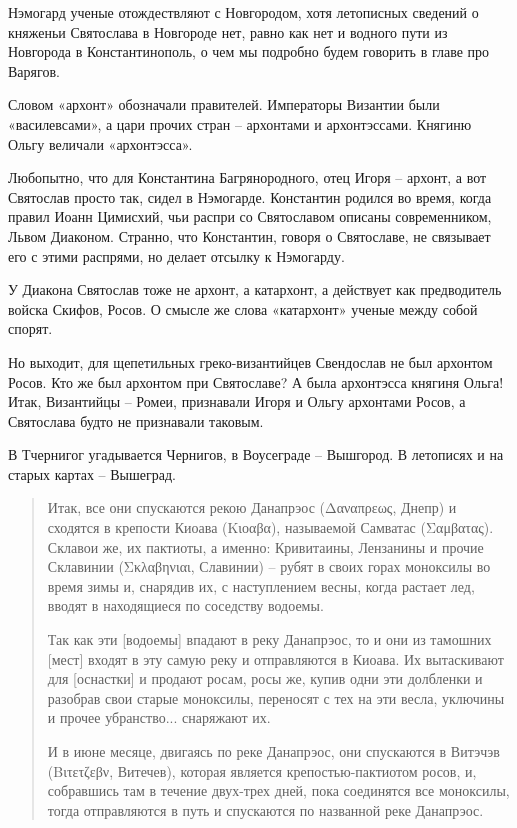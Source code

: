 Нэмогард ученые отождествляют с Новгородом, хотя летописных сведений о княженьи Святослава в Новгороде нет, равно как нет и водного пути из Новгорода в Константинополь, о чем мы подробно будем говорить в главе про Варягов.

Словом «архонт» обозначали правителей. Императоры Византии были «василевсами», а цари прочих стран – архонтами и архонтэссами. Княгиню Ольгу величали «архонтэсса». 

Любопытно, что для Константина Багрянородного, отец Игоря – архонт, а вот Святослав просто так, сидел в Нэмогарде. Константин родился во время, когда правил Иоанн Цимисхий, чьи распри со Святославом описаны современником, Львом Диаконом. Странно, что Константин, говоря о Святославе, не связывает его с этими распрями, но делает отсылку к Нэмогарду.

У Диакона Святослав тоже не архонт, а катархонт, а действует как предводитель войска Скифов, Росов. О смысле же слова «катархонт» ученые между собой спорят.

Но выходит, для щепетильных греко-византийцев Свендослав не был архонтом Росов. Кто же был архонтом при Святославе? А была архонтэсса княгиня Ольга! Итак, Византийцы – Ромеи, признавали Игоря и Ольгу архонтами Росов, а Святослава будто не признавали таковым.

В Тчернигог угадывается Чернигов, в Воусеграде – Вышгород. В летописях и на старых картах – Вышеград.

\begin{quotation}
Итак, все они спускаются рекою Данапрэос (Δανα\-πρεως, Днепр) и сходятся в крепости Киоава (Κιοαβα), называемой Самватас (Σαμβατας). Склавои же, их пактиоты, а именно: Кривитаины, Лензанины и прочие Склавинии (Σκλαβηνι\-αι, Славинии) – рубят в своих горах моноксилы во время зимы и, снарядив их, с наступлением весны, когда растает лед, вводят в находящиеся по соседству водоемы. 

Так как эти [водоемы] впадают в реку Данапрэос, то и они из тамошних [мест] входят в эту самую реку и отправляются в Киоава. Их вытаскивают для [оснастки] и продают росам, росы же, купив одни эти долбленки и разобрав свои старые моноксилы, переносят с тех на эти весла, уключины и прочее убранство... снаряжают их. 

И в июне месяце, двигаясь по реке Данапрэос, они спускаются в Витэчэв (Βιτετζεβν, Витечев), которая является крепостью-пактиотом росов, и, собравшись там в течение двух-трех дней, пока соединятся все моноксилы, тогда отправляются в путь и спускаются по названной реке Данапрэос.
\end{quotation}


